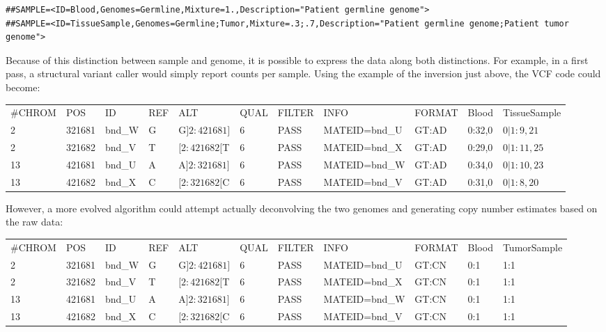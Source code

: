 \documentclass[8pt]{article}
\begin{document}
\footnotesize
\begin{verbatim}
##SAMPLE=<ID=Blood,Genomes=Germline,Mixture=1.,Description="Patient germline genome">
##SAMPLE=<ID=TissueSample,Genomes=Germline;Tumor,Mixture=.3;.7,Description="Patient germline genome;Patient tumor genome">
\end{verbatim}
\normalsize

Because of this distinction between sample and genome, it is possible to express the data along both distinctions.
For example, in a first pass, a structural variant caller would simply report counts per sample.
Using the example of the inversion just above, the VCF code could become:

\vspace{0.3cm}
\tiny
\begin{flushleft}
\begin{tabular}{ l l l l l l l l l l l }
\#CHROM & POS & ID & REF & ALT & QUAL & FILTER & INFO & FORMAT & Blood & TissueSample\\
2 & 321681 & bnd\_W & G & G$]2:421681]$ & 6 & PASS & MATEID=bnd\_U & GT:AD & 0:32,0 & $0|1:9,21$ \\
2 & 321682 & bnd\_V & T & $[2:421682[$T & 6 & PASS & MATEID=bnd\_X & GT:AD & 0:29,0 & $0|1:11,25$ \\
13 & 421681 & bnd\_U & A & A$]2:321681]$ & 6 & PASS & MATEID=bnd\_W & GT:AD & 0:34,0 & $0|1:10,23$ \\
13 & 421682 & bnd\_X & C & $[2:321682[$C & 6 & PASS & MATEID=bnd\_V & GT:AD & 0:31,0 & $0|1:8,20$ \\
\end{tabular}
\end{flushleft}
\normalsize
\vspace{0.3cm}

However, a more evolved algorithm could attempt actually deconvolving the two genomes and generating copy number estimates based on the raw data:

\vspace{0.3cm}
\tiny
\begin{flushleft}
\begin{tabular}{ l l l l l l l l l l l }
\#CHROM & POS & ID & REF & ALT & QUAL & FILTER & INFO & FORMAT & Blood & TumorSample \\
2 & 321681 & bnd\_W & G & G$]2:421681]$ & 6 & PASS & MATEID=bnd\_U & GT:CN & 0:1 & 1:1 \\
2 & 321682 & bnd\_V & T & $[2:421682[$T & 6 & PASS & MATEID=bnd\_X & GT:CN & 0:1 & 1:1 \\
13 & 421681 & bnd\_U & A & A$]2:321681]$ & 6 & PASS & MATEID=bnd\_W & GT:CN & 0:1 & 1:1 \\
13 & 421682 & bnd\_X & C & $[2:321682[$C & 6 & PASS & MATEID=bnd\_V & GT:CN & 0:1 & 1:1 \\
\end{tabular}
\end{flushleft}
\normalsize
\end{document}
